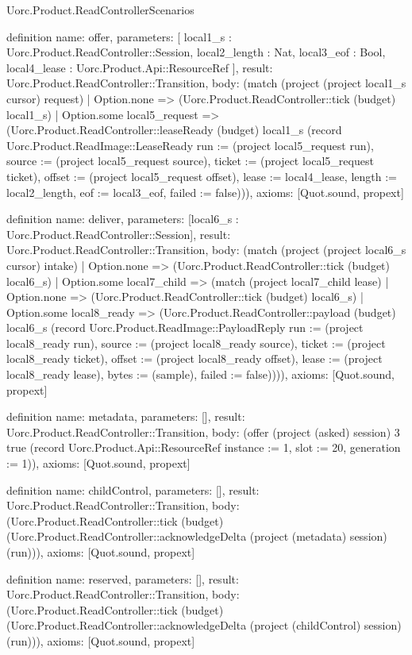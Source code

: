 \begin{lexlean}{Uorc.Product.ReadControllerScenarios}
\begin{semanticmodule}
definition{
  name: offer,
  parameters: [
    local1_s : Uorc.Product.ReadController::Session,
    local2_length : Nat,
    local3_eof : Bool,
    local4_lease : Uorc.Product.Api::ResourceRef
  ],
  result: Uorc.Product.ReadController::Transition,
  body: (match (project (project local1_s cursor) request)
    | Option.none => (Uorc.Product.ReadController::tick (budget) local1_s)
    | Option.some local5_request => (Uorc.Product.ReadController::leaseReady (budget) local1_s (record Uorc.Product.ReadImage::LeaseReady {run := (project local5_request run), source := (project local5_request source), ticket := (project local5_request ticket), offset := (project local5_request offset), lease := local4_lease, length := local2_length, eof := local3_eof, failed := false}))),
  axioms: [Quot.sound, propext]
}

definition{
  name: deliver,
  parameters: [local6_s : Uorc.Product.ReadController::Session],
  result: Uorc.Product.ReadController::Transition,
  body: (match (project (project local6_s cursor) intake)
    | Option.none => (Uorc.Product.ReadController::tick (budget) local6_s)
    | Option.some local7_child => (match (project local7_child lease)
      | Option.none => (Uorc.Product.ReadController::tick (budget) local6_s)
      | Option.some local8_ready => (Uorc.Product.ReadController::payload (budget) local6_s (record Uorc.Product.ReadImage::PayloadReply {run := (project local8_ready run), source := (project local8_ready source), ticket := (project local8_ready ticket), offset := (project local8_ready offset), lease := (project local8_ready lease), bytes := (sample), failed := false})))),
  axioms: [Quot.sound, propext]
}

definition{
  name: metadata,
  parameters: [],
  result: Uorc.Product.ReadController::Transition,
  body: (offer (project (asked) session) 3 true (record Uorc.Product.Api::ResourceRef {instance := 1, slot := 20, generation := 1})),
  axioms: [Quot.sound, propext]
}

definition{
  name: childControl,
  parameters: [],
  result: Uorc.Product.ReadController::Transition,
  body: (Uorc.Product.ReadController::tick (budget) (Uorc.Product.ReadController::acknowledgeDelta (project (metadata) session) (run))),
  axioms: [Quot.sound, propext]
}

definition{
  name: reserved,
  parameters: [],
  result: Uorc.Product.ReadController::Transition,
  body: (Uorc.Product.ReadController::tick (budget) (Uorc.Product.ReadController::acknowledgeDelta (project (childControl) session) (run))),
  axioms: [Quot.sound, propext]
}


\end{semanticmodule}
\end{lexlean}
